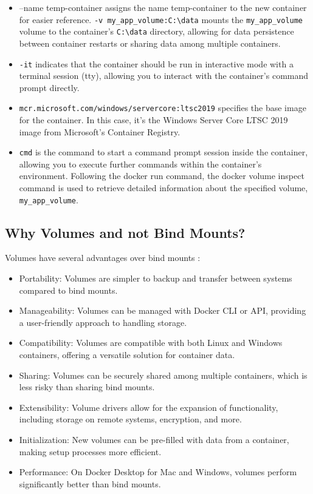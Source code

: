 \documentclass{article}
\begin{document}
\begin{itemize}
\item --name temp-container assigns the name temp-container to the new container for easier reference.
\texttt{-v my\_app\_volume:C:\textbackslash{}data} mounts the \texttt{my\_app\_volume} volume to the container's \texttt{C:\textbackslash{}data} directory, allowing for data persistence between container restarts or sharing data among multiple containers.
\item \texttt{-it} indicates that the container should be run in interactive mode with a terminal session (tty), allowing you to interact with the container's command prompt directly.
\item \texttt{mcr.microsoft.com/windows/servercore:ltsc2019} specifies the base image for the container. In this case, it's the Windows Server Core LTSC 2019 image from Microsoft's Container Registry.
\item \texttt{cmd} is the command to start a command prompt session inside the container, allowing you to execute further commands within the container's environment.
Following the docker run command, the docker volume inspect command is used to retrieve detailed information about the specified volume, \texttt{my\_app\_volume}. 
\end{itemize}

\subsection{Why Volumes and not Bind Mounts?}
Volumes have several advantages over bind mounts \cite{dockervol}:
\begin{itemize}
\item Portability: Volumes are simpler to backup and transfer between systems compared to bind mounts.

\item Manageability: Volumes can be managed with Docker CLI or API, providing a user-friendly approach to handling storage.

\item Compatibility: Volumes are compatible with both Linux and Windows containers, offering a versatile solution for container data.

\item Sharing: Volumes can be securely shared among multiple containers, which is less risky than sharing bind mounts.

\item Extensibility: Volume drivers allow for the expansion of functionality, including storage on remote systems, encryption, and more.

\item Initialization: New volumes can be pre-filled with data from a container, making setup processes more efficient.

\item Performance: On Docker Desktop for Mac and Windows, volumes perform significantly better than bind mounts.
\end{itemize}
\end{document}
